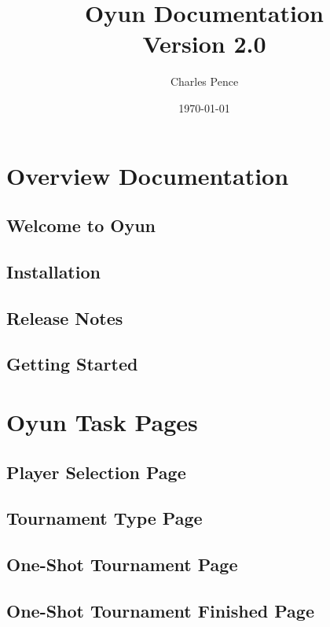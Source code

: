 \documentclass[openany]{book}
\title{Oyun Documentation \\ {\large Version 2.0}}
\author{Charles Pence}
\date{\today}
\begin{document}
\maketitle

\tableofcontents

\part{Overview Documentation}

\chapter{Welcome to Oyun}


\chapter{Installation}


\chapter{Release Notes}


\chapter{Getting Started}


\part{Oyun Task Pages}

\chapter{Player Selection Page}


\chapter{Tournament Type Page}


\chapter{One-Shot Tournament Page}


\chapter{One-Shot Tournament Finished Page}

\end{document}
